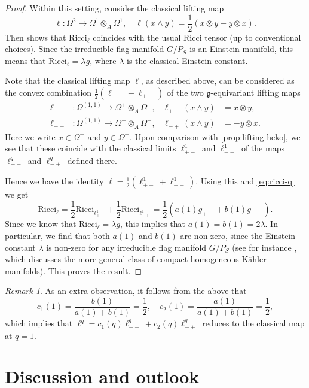 \documentclass[a4paper,12pt,reqno,english]{amsart}
\numberwithin{equation}{section}
\numberwithin{figure}{section}
\theoremstyle{plain}
\theoremstyle{plain}
\theoremstyle{plain}
\theoremstyle{plain}
\theoremstyle{plain}
\theoremstyle{definition}
\theoremstyle{definition}
\theoremstyle{definition}
\theoremstyle{remark}
\newtheorem{remark}[theorem]{Remark}
\theoremstyle{definition}
\newcommand{\lieg}{\mathfrak{g}}
\newcommand{\Ricci}{\mathrm{Ricci}}
\newcommand{\liftmap}{\ell}
\newcommand{\liftqpm}{\ell^q_{+ -}}
\newcommand{\liftqmp}{\ell^q_{- +}}
\begin{document}
\begin{proof}
Within this setting, consider the classical lifting map
\[
\ell: \Omega^2 \to \Omega^1 \otimes_A \Omega^1, \quad
\ell(x \wedge y) = \frac{1}{2} (x \otimes y - y \otimes x).
\]
Then \cite[Example 8.10]{quantum-book} shows that $\Ricci_\ell$ coincides with the usual Ricci tensor (up to conventional choices).
Since the irreducible flag manifold $G / P_S$ is an Einstein manifold, this means that $\Ricci_\ell = \lambda g$, where $\lambda$ is the classical Einstein constant.

Note that the classical lifting map $\ell$, as described above, can be considered as the convex combination $\frac{1}{2} (\liftmap_{+ -} + \liftmap_{+ -})$ of the two $\lieg$-equivariant lifting maps
\begin{align*}
\ell_{+ -} & : \Omega^{(1, 1)} \to \Omega^+ \otimes_A \Omega^-, & \ell_{+ -}(x \wedge y) & = x \otimes y, \\
\ell_{- +} & : \Omega^{(1, 1)} \to \Omega^- \otimes_A \Omega^+, & \ell_{- +}(x \wedge y) & = - y \otimes x.
\end{align*}
Here we write $x \in \Omega^+$ and $y \in \Omega^-$.
Upon comparison with \cref{prop:lifting-heko}, we see that these coincide with the classical limits $\liftmap^1_{+ -}$ and $\liftmap^1_{- +}$ of the maps $\liftqpm$ and $\liftqmp$ defined there.

Hence we have the identity $\liftmap = \frac{1}{2} (\liftmap^1_{+ -} + \liftmap^1_{+ -})$. Using this and \eqref{eq:ricci-q} we get
\[
\Ricci_{\ell} = \frac{1}{2} \Ricci_{\ell^1_{+ -}} + \frac{1}{2} \Ricci_{\ell^1_{- +}} = \frac{1}{2} \left( a(1) g_{+ -} + b(1) g_{- +} \right).
\]
Since we know that $\Ricci_\ell = \lambda g$, this implies that $a(1) = b(1) = 2 \lambda$. In particular, we find that both $a(1)$ and $b(1)$ are non-zero, since the Einstein constant $\lambda$ is non-zero for any irreducible flag manifold $G / P_S$ (see for instance \cite[Chapter 8]{besse}, which discusses the more general class of compact homogeneous Kähler manifolds).
This proves the result.
\end{proof}

\begin{remark}
As an extra observation, it follows from the above that
\[
c_1(1) = \frac{b(1)}{a(1) + b(1)} = \frac{1}{2}, \quad
c_2(1) = \frac{a(1)}{a(1) + b(1)} = \frac{1}{2},
\]
which implies that $\liftmap^q = c_1(q) \liftqpm + c_2(q) \liftqmp$ reduces to the classical map at $q = 1$.
\end{remark}

\section{Discussion and outlook}
\label{sec:discussion}
\end{document}
